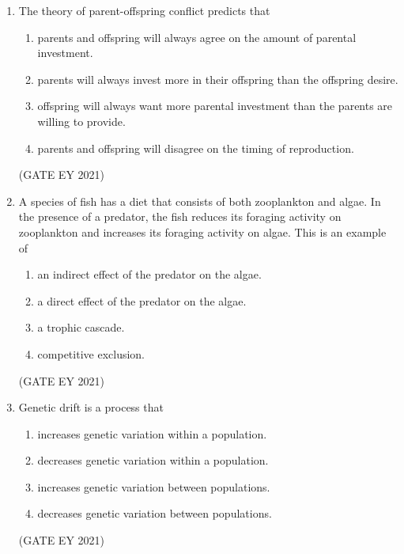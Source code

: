 \documentclass[journal]{IEEEtran}
\begin{document}
\begin{enumerate}
    \item The theory of parent-offspring conflict predicts that
    \begin{enumerate}
        \item parents and offspring will always agree on the amount of parental investment.
        \item parents will always invest more in their offspring than the offspring desire.
        \item offspring will always want more parental investment than the parents are willing to provide.
        \item parents and offspring will disagree on the timing of reproduction.
    \end{enumerate}
    \hfill{(GATE EY 2021)}

    \item A species of fish has a diet that consists of both zooplankton and algae. In the presence of a predator, the fish reduces its foraging activity on zooplankton and increases its foraging activity on algae. This is an example of
    \begin{enumerate}
        \item an indirect effect of the predator on the algae.
        \item a direct effect of the predator on the algae.
        \item a trophic cascade.
        \item competitive exclusion.
    \end{enumerate}
    \hfill{(GATE EY 2021)}

    \item Genetic drift is a process that
    \begin{enumerate}
        \item increases genetic variation within a population.
        \item decreases genetic variation within a population.
        \item increases genetic variation between populations.
        \item decreases genetic variation between populations.
    \end{enumerate}
    \hfill{(GATE EY 2021)}
    

\end{enumerate}
\end{document}
